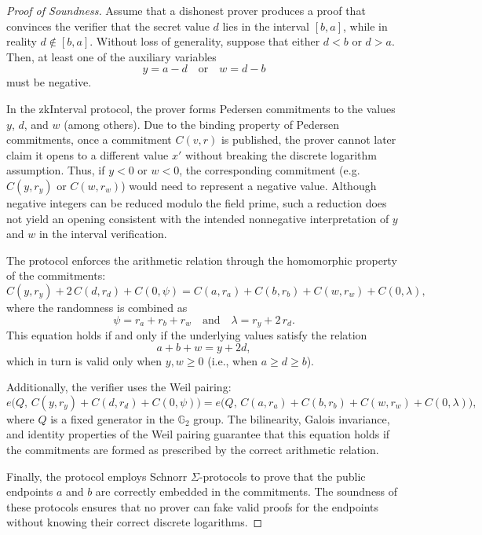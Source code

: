 \documentclass[version=preprint]{iacrcc}
\begin{document}
\begin{proof}[Proof of Soundness]
  Assume that a dishonest prover produces a proof that convinces the verifier that the secret value \( d \) lies in the interval \([b, a]\), while in reality \( d \notin [b, a] \). Without loss of generality, suppose that either \( d < b \) or \( d > a \). Then, at least one of the auxiliary variables
  \[
  y = a - d \quad \text{or} \quad w = d - b
  \]
  must be negative.
  
  In the zkInterval protocol, the prover forms Pedersen commitments to the values \( y \), \( d \), and \( w \) (among others). Due to the binding property of Pedersen commitments, once a commitment \( C(v, r) \) is published, the prover cannot later claim it opens to a different value \( x' \) without breaking the discrete logarithm assumption. Thus, if \( y < 0 \) or \( w < 0 \), the corresponding commitment (e.g. \( C(y, r_y) \) or \( C(w, r_w) \)) would need to represent a negative value. Although negative integers can be reduced modulo the field prime, such a reduction does not yield an opening consistent with the intended nonnegative interpretation of \( y \) and \( w \) in the interval verification.
  
  The protocol enforces the arithmetic relation through the homomorphic property of the commitments:
  \[
  C(y, r_y) + 2\,C(d, r_d) + C(0, \psi) = C(a, r_a) + C(b, r_b) + C(w, r_w) + C(0, \lambda),
  \]
  where the randomness is combined as
  \[
  \psi = r_a + r_b + r_w \quad \text{and} \quad \lambda = r_y + 2\,r_d.
  \]
  This equation holds if and only if the underlying values satisfy the relation
  \[
  a + b + w = y + 2d,
  \]
  which in turn is valid only when \( y, w \geq 0 \) (i.e., when \( a \geq d \geq b \)).
  
  Additionally, the verifier uses the Weil pairing:
  \[
  e\Big(Q,\, C(y, r_y) + C(d, r_d) + C(0, \psi)\Big) = e\Big(Q,\, C(a, r_a) + C(b, r_b) + C(w, r_w) + C(0, \lambda)\Big),
  \]
  where \( Q \) is a fixed generator in the \( \mathbb{G}_{2} \) group. The bilinearity, Galois invariance, and identity properties of the Weil pairing guarantee that this equation holds if the commitments are formed as prescribed by the correct arithmetic relation.
  
  Finally, the protocol employs Schnorr \(\Sigma\)-protocols to prove that the public endpoints \( a \) and \( b \) are correctly embedded in the commitments. The soundness of these protocols ensures that no prover can fake valid proofs for the endpoints without knowing their correct discrete logarithms.
  

\end{proof}
\end{document}
